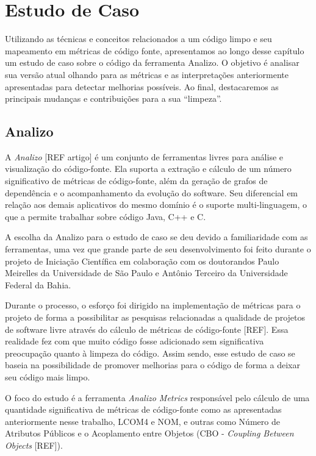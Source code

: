 \chapter{Estudo de Caso}
\label{chap:estudodecaso}


Utilizando as técnicas e conceitos relacionados a um código limpo e seu mapeamento 
em métricas de código fonte, apresentamos ao longo desse capítulo um estudo de caso
sobre o código da ferramenta Analizo. O objetivo é analisar sua versão atual
olhando para as métricas e as interpretações anteriormente apresentadas para detectar
melhorias possíveis. Ao final, destacaremos as principais mudanças e contribuições para
a sua ``limpeza''.


\section{Analizo}
A \textit{Analizo} [REF artigo] é um conjunto de ferramentas livres para análise e visualização
do código-fonte. Ela suporta a extração e cálculo de um número significativo de métricas
de código-fonte, além da geração de grafos de dependência e o acompanhamento da evolução do software.
Seu diferencial em relação aos demais aplicativos do mesmo domínio é o suporte multi-linguagem,
o que a permite trabalhar sobre código Java, C++ e C.

A escolha da Analizo para o estudo de caso se deu devido a familiaridade com as ferramentas, 
uma vez que grande parte de seu desenvolvimento foi feito durante o projeto de Iniciação
Científica em colaboração com os doutorandos Paulo Meirelles da Universidade de São Paulo
e Antônio Terceiro da Universidade Federal da Bahia.

Durante o processo, o esforço foi dirigido na implementação de métricas para o projeto
de forma a possibilitar as pesquisas relacionadas a qualidade de 
projetos de software livre através do cálculo de métricas de código-fonte [REF]. Essa
realidade fez com que muito código fosse adicionado sem significativa preocupação quanto
à limpeza do código. Assim sendo, esse estudo de caso se baseia na possibilidade de promover
melhorias para o código de forma a deixar seu código mais limpo.

O foco do estudo é a ferramenta \textit{Analizo Metrics} responsável pelo cálculo de
uma quantidade significativa de métricas de código-fonte como as apresentadas anteriormente
nesse trabalho, LCOM4 e NOM, e outras como Número de Atributos Públicos e o Acoplamento
entre Objetos (CBO - \textit{Coupling Between Objects} [REF]).


